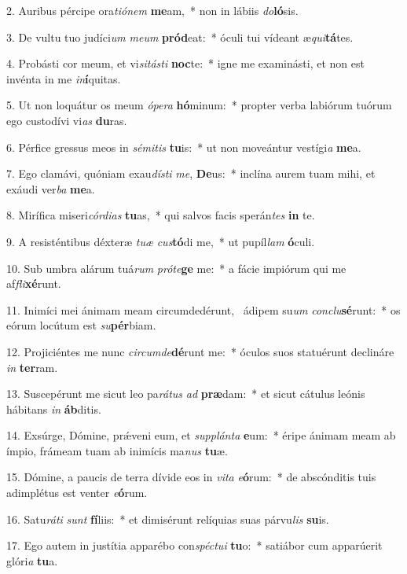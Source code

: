 2. Auribus pércipe ora\textit{ti}\textit{ó}\textit{nem} \textbf{me}am,~*  non in lábiis \textit{do}\textbf{ló}sis.\

3. De vultu tuo judíci\textit{um} \textit{me}\textit{um} \textbf{pród}eat:~*  óculi tui vídeant æ\textit{qui}\textbf{tá}tes.\

4. Probásti cor meum, et vi\textit{si}\textit{tás}\textit{ti} \textbf{noc}te:~*  igne me examinásti, et non est invénta in me \textit{in}\textbf{í}quitas.\

5. Ut non loquátur os meum \textit{ó}\textit{pe}\textit{ra} \textbf{hó}minum:~*  propter verba labiórum tuórum ego custodívi vi\textit{as} \textbf{du}ras.\

6. Pérfice gressus meos in \textit{sé}\textit{mi}\textit{tis} \textbf{tu}is:~*  ut non moveántur vestígi\textit{a} \textbf{me}a.\

7. Ego clamávi, quóniam exau\textit{dís}\textit{ti} \textit{me}, \textbf{De}us:~*  inclína aurem tuam mihi, et exáudi ver\textit{ba} \textbf{me}a.\

8. Mirífica miseri\textit{cór}\textit{di}\textit{as} \textbf{tu}as,~*  qui salvos facis sperán\textit{tes} \textbf{in} te.\

9. A resisténtibus déxteræ \textit{tu}\textit{æ} \textit{cus}\textbf{tó}di me,~*  ut pupíl\textit{lam} \textbf{ó}culi.\

10. Sub umbra alárum tuá\textit{rum} \textit{pró}\textit{te}\textbf{ge} me:~*  a fácie impiórum qui me af\textit{fli}\textbf{xé}runt.\

11. Inimíci mei ánimam meam circumdedérunt, \dag\  ádipem su\textit{um} \textit{con}\textit{clu}\textbf{sé}runt:~*  os eórum locútum est \textit{su}\textbf{pér}biam.\

12. Projiciéntes me nunc \textit{cir}\textit{cum}\textit{de}\textbf{dé}runt me:~*  óculos suos statuérunt declináre \textit{in} \textbf{ter}ram.\

13. Suscepérunt me sicut leo pa\textit{rá}\textit{tus} \textit{ad} \textbf{præ}dam:~*  et sicut cátulus leónis hábitans \textit{in} \textbf{áb}ditis.\

14. Exsúrge, Dómine, prǽveni eum, et \textit{sup}\textit{plán}\textit{ta} \textbf{e}um:~*  éripe ánimam meam ab ímpio, frámeam tuam ab inimícis ma\textit{nus} \textbf{tu}æ.\

15. Dómine, a paucis de terra dívide eos in \textit{vi}\textit{ta} \textit{e}\textbf{ó}rum:~*  de abscónditis tuis adimplétus est venter \textit{e}\textbf{ó}rum.\

16. Satu\textit{rá}\textit{ti} \textit{sunt} \textbf{fí}liis:~*  et dimisérunt relíquias suas párvu\textit{lis} \textbf{su}is.\

17. Ego autem in justítia apparébo con\textit{spéc}\textit{tu}\textit{i} \textbf{tu}o:~*  satiábor cum apparúerit glóri\textit{a} \textbf{tu}a.\

